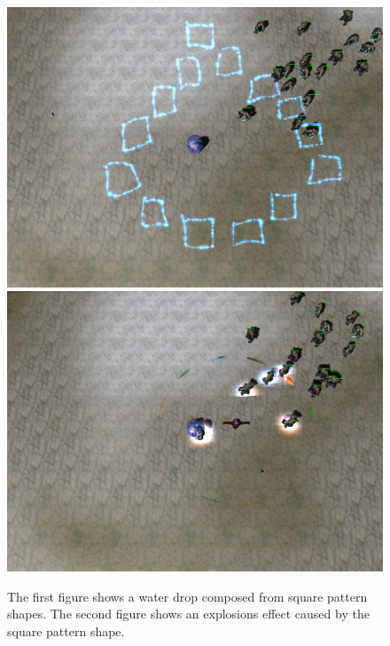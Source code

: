 \begin{figure}[p]
\centering
\includegraphics[width=.9\linewidth]{ext/scr/patsquare.png}
\quad
\includegraphics[width=.9\linewidth]{ext/scr/patsquaree.png}
\caption{The first figure shows a water drop composed from square pattern shapes. The second figure shows an explosions effect caused by the square pattern shape. }
\label{fig:spell:patsquare}
\end{figure}

